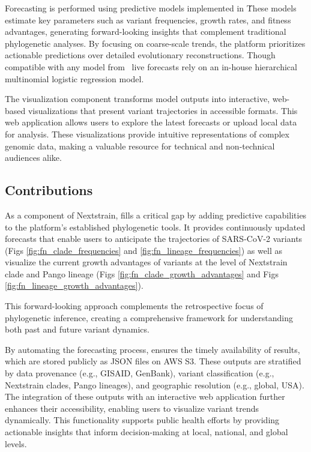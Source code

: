 Forecasting is performed using predictive models implemented in \evofr\.
These models estimate key parameters such as variant frequencies, growth rates, and fitness advantages, generating forward-looking insights that complement traditional phylogenetic analyses.
By focusing on coarse-scale trends, the platform prioritizes actionable predictions over detailed evolutionary reconstructions.
Though compatible with any model from \evofr\, live forecasts rely on an in-house hierarchical multinomial logistic regression model.

The visualization component transforms model outputs into interactive, web-based visualizations that present variant trajectories in accessible formats.
This web application allows users to explore the latest forecasts or upload local data for analysis.
These visualizations provide intuitive representations of complex genomic data, making \forecastsNcov a valuable resource for technical and non-technical audiences alike.

\subsection{Contributions}

As a component of Nextstrain, \forecastsNcov fills a critical gap by adding predictive capabilities to the platform’s established phylogenetic tools.
It provides continuously updated forecasts that enable users to anticipate the trajectories of SARS-CoV-2 variants (Figs \ref{fig:fn_clade_frequencies} and \ref{fig:fn_lineage_frequencies})  as well as visualize the current growth advantages of variants at the level of Nextstrain clade and Pango lineage (Figs \ref{fig:fn_clade_growth_advantages} and Figs \ref{fig:fn_lineage_growth_advantages}).

This forward-looking approach complements the retrospective focus of phylogenetic inference, creating a comprehensive framework for understanding both past and future variant dynamics.

By automating the forecasting process, \forecastsNcov ensures the timely availability of results, which are stored publicly as JSON files on AWS S3.
These outputs are stratified by data provenance (e.g., GISAID, GenBank), variant classification (e.g., Nextstrain clades, Pango lineages), and geographic resolution (e.g., global, USA).
The integration of these outputs with an interactive web application further enhances their accessibility, enabling users to visualize variant trends dynamically.
This functionality supports public health efforts by providing actionable insights that inform decision-making at local, national, and global levels.

